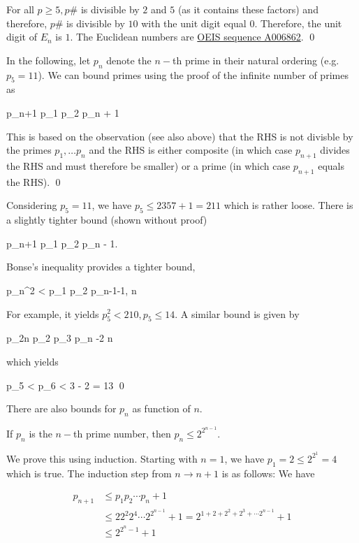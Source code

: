 For all $p \geq 5, p \#$ is divisible by $2$ and $5$ (as it contains these factors) and therefore, $p \#$ is divisible by $10$ with the unit digit equal $0$. Therefore, the unit digit of $E_n$ is $1$. The Euclidean numbers are \href{https://oeis.org/A006862}{OEIS sequence A006862}. \qed


In the following, let $p_n$ denote the $n-$th prime in their natural ordering (e.g. $p_5 = 11$). We can bound primes using the proof of the infinite number of primes as

\bee
p_{n+1} \leq p_1 p_2 \cdots p_n + 1
\eee

This is based on the observation (see also above) that the RHS is not divisble by the primes $p_1, \ldots p_n$ and the RHS is either composite (in which case $p_{n+1}$ divides the RHS and must therefore be smaller) or a prime (in which case $p_{n+1}$ equals the RHS). \qed

Considering $p_5 = 11$, we have $p_5 \leq 2 3 5 7 + 1 = 211$ which is rather loose. There is a slightly tighter bound (shown without proof)

\bee
p_{n+1} \leq p_1 p_2 \cdots p_n - 1. 
\eee

Bonse's inequality provides a tighter bound, 

\bee
p_n^2  < p_1 p_2 \cdots p_{n-1}-1, \quad n 
\eee

For example, it yields $p_5^2 < 210, p_5 \leq 14$. A similar bound is given by

\bee
p_{2n} \leq p_2 p_3 \cdots p_n -2 \quad n 
\eee

which yields

\bee
p_5 < p_6 < 3  - 2 = 13 \qed
\eee

There are also bounds for $p_n$ as function of $n$.

\begin{theorem}
    If $p_n$ is the $n-$th prime number, then $p_n \leq 2^{2^{n-1}}$.
\end{theorem}

We prove this using induction. Starting with $n=1$, we have $p_1 = 2 \leq 2^{2^{1}} = 4$ which is true. The induction step from $n \rightarrow n+1$ is as follows: We have

\begin{align*}
p_{n+1} & \leq p_1 p_2 \cdots p_n + 1 \\
        & \leq 2 2^2 2^4 \cdots 2^{2^{n-1}} + 1 = 2^{1 + 2 + 2^2 + 2^3 + \cdots 2^{n-1}} + 1 \\ 
        & \leq 2^{2^{n}-1} + 1
\end{align*}

